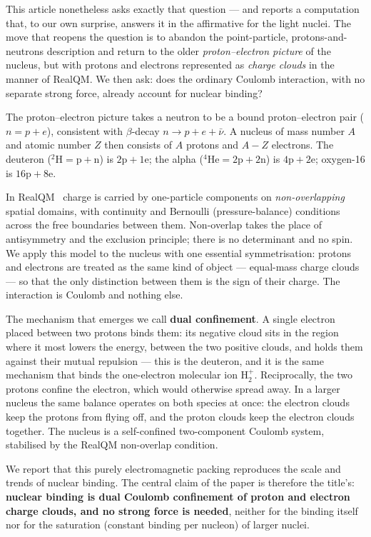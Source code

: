 \documentclass[11pt]{article}
\begin{document}
This article nonetheless asks exactly that question --- and reports a computation that, to our
own surprise, answers it in the affirmative for the light nuclei. The move that reopens the
question is to abandon the point-particle, protons-and-neutrons description and return to the
older \emph{proton--electron picture} of the nucleus, but with protons and electrons represented
as \emph{charge clouds} in the manner of RealQM. We then ask: does the ordinary Coulomb
interaction, with no separate strong force, already account for nuclear binding?

The proton--electron picture takes a neutron to be a bound proton--electron pair
($n = p + e$), consistent with $\beta$-decay $n\to p+e+\bar\nu$. A nucleus of mass number $A$
and atomic number $Z$ then consists of $A$ protons and $A-Z$ electrons. The deuteron
($^2\mathrm{H}=\mathrm{p}+\mathrm{n}$) is $\mathrm{2p}+\mathrm{1e}$; the alpha
($^4\mathrm{He}=\mathrm{2p}+\mathrm{2n}$) is $\mathrm{4p}+\mathrm{2e}$; oxygen-16 is
$\mathrm{16p}+\mathrm{8e}$.

In RealQM~\cite{Johnson-RealQM,Johnson-Atoms} charge is carried by one-particle components on
\emph{non-overlapping} spatial domains, with continuity and Bernoulli (pressure-balance)
conditions across the free boundaries between them. Non-overlap takes the place of
antisymmetry and the exclusion principle; there is no determinant and no spin. We apply this
model to the nucleus with one essential symmetrisation: protons and electrons are treated as
the same kind of object --- equal-mass charge clouds --- so that the only distinction between
them is the sign of their charge. The interaction is Coulomb and nothing else.

The mechanism that emerges we call \textbf{dual confinement}. A single electron placed between
two protons binds them: its negative cloud sits in the region where it most lowers the energy,
between the two positive clouds, and holds them against their mutual repulsion --- this is the
deuteron, and it is the same mechanism that binds the one-electron molecular ion
$\mathrm{H}_2^+$. Reciprocally, the two protons confine the electron, which would otherwise
spread away. In a larger nucleus the same balance operates on both species at once: the
electron clouds keep the protons from flying off, and the proton clouds keep the electron
clouds together. The nucleus is a self-confined two-component Coulomb system, stabilised by the
RealQM non-overlap condition.

We report that this purely electromagnetic packing reproduces the scale and trends of nuclear
binding. The central claim of the paper is therefore the title's: \textbf{nuclear binding is
dual Coulomb confinement of proton and electron charge clouds, and no strong force is needed},
neither for the binding itself nor for the saturation (constant binding per nucleon) of larger
nuclei.
\end{document}

